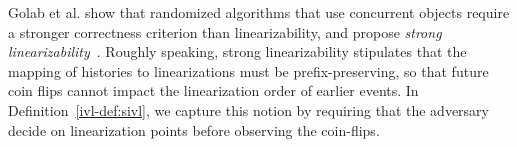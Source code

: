 


Golab et al. show that randomized algorithms that use concurrent objects require a stronger
correctness criterion than linearizability, and propose \emph{strong linearizability}~\cite{Wojciech}.
Roughly speaking, strong linearizability stipulates that the
mapping of histories to linearizations must be prefix-preserving,
so that future coin flips cannot impact the
linearization order of earlier events. In Definition~\ref{ivl-def:sivl}, we capture this notion
by requiring that the adversary decide on linearization points before observing the coin-flips.




